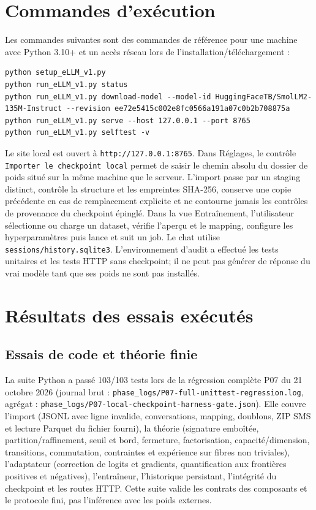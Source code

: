 \documentclass[11pt,a4paper]{article}
\begin{document}
\section{Commandes d'exécution}
Les commandes suivantes sont des commandes de référence pour une machine avec Python 3.10+ et un accès réseau lors de l'installation/téléchargement :
\begin{lstlisting}[basicstyle=\ttfamily\small,breaklines=true]
python setup_eLLM_v1.py
python run_eLLM_v1.py status
python run_eLLM_v1.py download-model --model-id HuggingFaceTB/SmolLM2-135M-Instruct --revision ee72e5415c002e8fc0566a191a07c0b2b708875a
python run_eLLM_v1.py serve --host 127.0.0.1 --port 8765
python run_eLLM_v1.py selftest -v
\end{lstlisting}
Le site local est ouvert à \texttt{http://127.0.0.1:8765}. Dans Réglages, le contrôle \texttt{Importer le checkpoint local} permet de saisir le chemin absolu du dossier de poids situé sur la même machine que le serveur. L’import passe par un staging distinct, contrôle la structure et les empreintes SHA-256, conserve une copie précédente en cas de remplacement explicite et ne contourne jamais les contrôles de provenance du checkpoint épinglé. Dans la vue Entraînement, l'utilisateur sélectionne ou charge un dataset, vérifie l'aperçu et le mapping, configure les hyperparamètres puis lance et suit un job. Le chat utilise \texttt{sessions/history.sqlite3}. L'environnement d'audit a effectué les tests unitaires et les tests HTTP sans checkpoint; il ne peut pas générer de réponse du vrai modèle tant que ses poids ne sont pas installés.

\section{Résultats des essais exécutés}
\subsection{Essais de code et théorie finie}
La suite Python a passé 103/103 tests lors de la régression complète P07 du 21 octobre 2026 (journal brut : \texttt{phase\_logs/P07-full-unittest-regression.log}, agrégat : \texttt{phase\_logs/P07-local-checkpoint-harness-gate.json}). Elle couvre l'import (JSONL avec ligne invalide, conversations, mapping, doublons, ZIP SMS et lecture Parquet du fichier fourni), la théorie (signature emboîtée, partition/raffinement, seuil et bord, fermeture, factorisation, capacité/dimension, transitions, commutation, contraintes et expérience sur fibres non triviales), l'adaptateur (correction de logits et gradients, quantification aux frontières positives et négatives), l'entraîneur, l'historique persistant, l'intégrité du checkpoint et les routes HTTP. Cette suite valide les contrats des composants et le protocole fini, pas l'inférence avec les poids externes.
\end{document}
